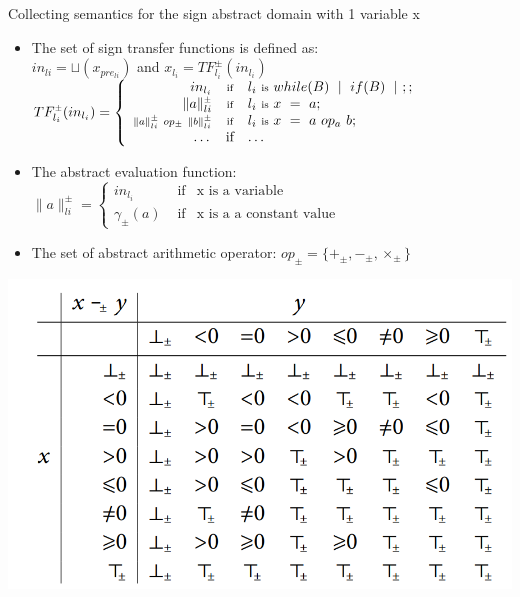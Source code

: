 \begin{frame}{Collecting semantics for the sign abstract domain with 1 variable x}
\begin{itemize}
	\item \scriptsize The set of sign transfer functions is defined as: \\$in_{li}=\sqcup(x_{pre_{li}})$ and $ x_{l_i}= TF^{\scriptscriptstyle \pm}_{l_i}(in_{l_i})$\\
	$  TF^{\scriptscriptstyle \pm}_{l_i}(in_{l_i}) =     \left\{ \begin{array}{rcl}
\textstyle	in_{l_i} &  \mbox{\scriptsize if}& \textstyle l_i~\text{\scriptsize is}~while(B)~\mid~ if(B) ~\mid~;;   \\
\textstyle	\|a\|_{li}^{\scriptscriptstyle \pm}  & \mbox{\scriptsize if} & \textstyle l_i~\mbox{\scriptsize is}~x~=~a; \\
\scriptstyle	\|a\|_{li}^{\scriptscriptstyle \pm}~op_\pm~ \|b\|_{li}^{\scriptscriptstyle \pm}  & \mbox{\scriptsize if} &  \textstyle l_i~\mbox{\scriptsize is}~x~=~a~op_a~b; \\
	\dots & \mbox{if} & \dots
	\end{array}\right.$
	
	\item \scriptsize The abstract evaluation function:\\  $ \|a\|_{li}^{\scriptscriptstyle \pm} =     \left\{ \begin{array}{rcl}
	in_{l_i} & \mbox{ if}&  \text{x is a variable}   \\
	\gamma_{\pm}(a)  & \mbox{ if} &  \text{x is a a constant value} 
\end{array}\right.$
\item The set of abstract arithmetic operator: $op_\pm=\{+_{\scriptscriptstyle \pm}, -_{\scriptscriptstyle \pm}, \times_{\scriptscriptstyle \pm}\}$
\end{itemize}
\centering \includegraphics[scale=0.40]{content/images/static-analysis/minus-sign.png}
\end{frame}

